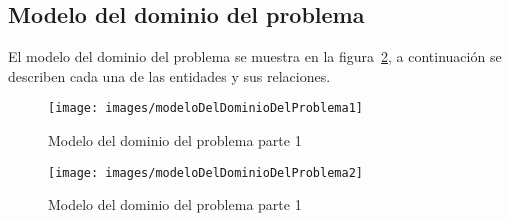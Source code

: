 \subsection{Modelo del dominio del problema}

	El modelo del dominio del problema se muestra en la figura~\ref{fig:modeloDeDominio}, a continuación se describen cada una de las entidades y sus relaciones.
	
\begin{figure}[htbp!]
	\begin{center}
		\texttt{[image: images/modeloDelDominioDelProblema1]}
		\caption{Modelo del dominio del problema parte 1}
		\label{fig:modeloDeDominio}
	\end{center}
\end{figure}

\begin{figure}[htbp!]
	\begin{center}
		\texttt{[image: images/modeloDelDominioDelProblema2]}
		\caption{Modelo del dominio del problema parte 1}
		\label{fig:modeloDeDominio}
	\end{center}
\end{figure}


\newenvironment{cdtEntidad}[2]{%
	\def \varBusinessEntityId{#2}%
	\hypertarget{#1}{\hspace{1pt}}%
	\newline%
	\noindent{\texttt{[image: images/uc/classRule]}}%
	\vspace{-25pt}%
	\subsection{Entidad: #2}%
	\noindent\begin{longtable}{|p{.2\textwidth}| p{.15\textwidth} | p{.46\textwidth} |p{.08\textwidth} |}%
		\hline%
		\multicolumn{4}{|c|}{{\cellcolor{colorSecundario}\color{white}Atributos}}\\ \hline%
		{\cellcolor{colorAgua}Nombre} &%
		{\cellcolor{colorAgua}Tipo} &%
		{\cellcolor{colorAgua}Descripción} &%
		{\cellcolor{colorAgua}Requerido}%
		\\ \hline%
		\endhead%
	}{%
	\end{longtable}%
}

\newcommand{\brAttr}[5]{%
	{\bf\hypertarget{\varBusinessEntityId:#1}{#2}} & {\em{#3}} & {#4} & #5 \\\hline
}

